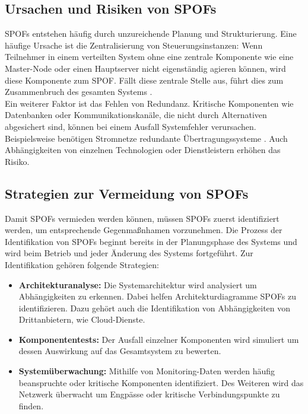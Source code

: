 \documentclass[a4paper,12pt]{article}
\begin{document}
\subsection{Ursachen und Risiken von \acp{SPOF}}
\acp{SPOF} entstehen häufig durch unzureichende Planung und Strukturierung. Eine häufige Ursache ist die Zentralisierung von Steuerungsinstanzen: Wenn Teilnehmer in einem verteilten System ohne eine zentrale Komponente wie eine Master-Node oder einen Hauptserver nicht eigenständig agieren können, wird diese Komponente zum SPOF. Fällt diese zentrale Stelle aus, führt dies zum Zusammenbruch des gesamten Systems \cite[S. 253f.]{Steen2006}.\\
Ein weiterer Faktor ist das Fehlen von Redundanz. Kritische Komponenten wie Datenbanken oder Kommunikationskanäle, die nicht durch Alternativen abgesichert sind, können bei einem Ausfall Systemfehler verursachen. Beispielsweise benötigen Stromnetze redundante Übertragungssysteme \cite[S. 61f.]{Jarass2009}. Auch Abhängigkeiten von einzelnen Technologien oder Dienstleistern erhöhen das Risiko. 


\subsection{Strategien zur Vermeidung von \acp{SPOF}}

Damit \acp{SPOF} vermieden werden können, müssen \acp{SPOF} zuerst identifiziert werden, um entsprechende Gegenmaßnhamen vorzunehmen. Die Prozess der Identifikation von \acp{SPOF} beginnt bereits in der Planungsphase des Systems und wird beim Betrieb und jeder Änderung des Systems fortgeführt. Zur Identifikation gehören folgende Strategien:

\begin{itemize}
    \item \textbf{Architekturanalyse:} Die Systemarchitektur wird analysiert um Abhängigkeiten zu erkennen. Dabei helfen Architekturdiagramme \acp{SPOF} zu identifizieren. Dazu gehört auch die Identifikation von Abhängigkeiten von Drittanbietern, wie Cloud-Dienste.
    \item \textbf{Komponententests:} Der Ausfall einzelner Komponenten wird simuliert um dessen Auswirkung auf das Gesamtsystem zu bewerten.
    \item \textbf{Systemüberwachung:} Mithilfe von Monitoring-Daten werden häufig beanspruchte oder kritische Komponenten identifiziert. Des Weiteren wird das Netzwerk überwacht um Engpässe oder kritische Verbindungspunkte zu finden. 
\end{itemize}
\end{document}
